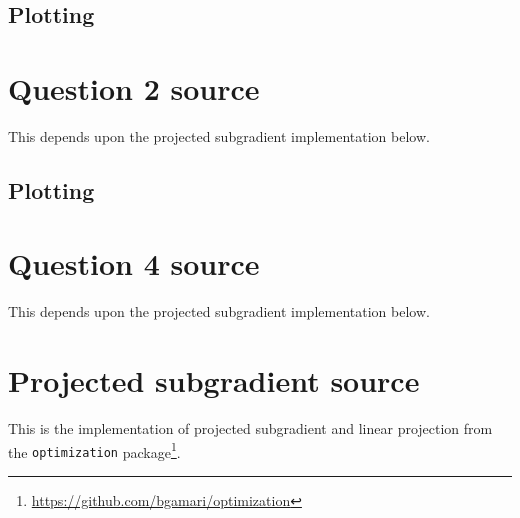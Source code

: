 \documentclass{article}
\begin{document}
\subsection{Plotting}


\section{Question 2 source}\label{Q2Source}
This depends upon the projected subgradient implementation below.

\subsection{Plotting}


\section{Question 4 source}\label{Q4Source}
This depends upon the projected subgradient implementation below.


\section{Projected subgradient source}\label{ProjSubgradSource}
This is the implementation of projected subgradient and linear
projection from the {\tt optimization}
package\footnote{\url{https://github.com/bgamari/optimization}}.


\end{document}
